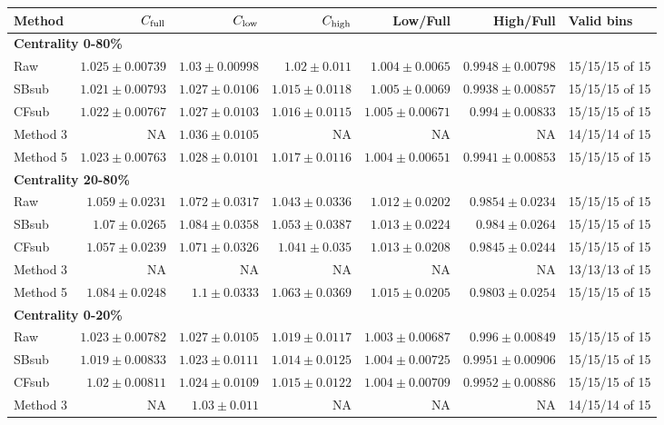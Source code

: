\documentclass[10pt,a4paper]{article}
\begin{document}
{\scriptsize\setlength{\tabcolsep}{3pt}\begin{longtable}{lrrrrrl}
\hline Method & $C_{\rm full}$ & $C_{\rm low}$ & $C_{\rm high}$ & Low/Full & High/Full & Valid bins\\\hline\endhead
\multicolumn{7}{l}{\textbf{Centrality 0-80\%}}\\
Raw & $1.025\pm0.00739$ & $1.03\pm0.00998$ & $1.02\pm0.011$ & $1.004\pm0.0065$ & $0.9948\pm0.00798$ & 15/15/15 of 15\\
SBsub & $1.021\pm0.00793$ & $1.027\pm0.0106$ & $1.015\pm0.0118$ & $1.005\pm0.0069$ & $0.9938\pm0.00857$ & 15/15/15 of 15\\
CFsub & $1.022\pm0.00767$ & $1.027\pm0.0103$ & $1.016\pm0.0115$ & $1.005\pm0.00671$ & $0.994\pm0.00833$ & 15/15/15 of 15\\
Method 3 & NA & $1.036\pm0.0105$ & NA & NA & NA & 14/15/14 of 15\\
Method 5 & $1.023\pm0.00763$ & $1.028\pm0.0101$ & $1.017\pm0.0116$ & $1.004\pm0.00651$ & $0.9941\pm0.00853$ & 15/15/15 of 15\\
\hline
\multicolumn{7}{l}{\textbf{Centrality 20-80\%}}\\
Raw & $1.059\pm0.0231$ & $1.072\pm0.0317$ & $1.043\pm0.0336$ & $1.012\pm0.0202$ & $0.9854\pm0.0234$ & 15/15/15 of 15\\
SBsub & $1.07\pm0.0265$ & $1.084\pm0.0358$ & $1.053\pm0.0387$ & $1.013\pm0.0224$ & $0.984\pm0.0264$ & 15/15/15 of 15\\
CFsub & $1.057\pm0.0239$ & $1.071\pm0.0326$ & $1.041\pm0.035$ & $1.013\pm0.0208$ & $0.9845\pm0.0244$ & 15/15/15 of 15\\
Method 3 & NA & NA & NA & NA & NA & 13/13/13 of 15\\
Method 5 & $1.084\pm0.0248$ & $1.1\pm0.0333$ & $1.063\pm0.0369$ & $1.015\pm0.0205$ & $0.9803\pm0.0254$ & 15/15/15 of 15\\
\hline
\multicolumn{7}{l}{\textbf{Centrality 0-20\%}}\\
Raw & $1.023\pm0.00782$ & $1.027\pm0.0105$ & $1.019\pm0.0117$ & $1.003\pm0.00687$ & $0.996\pm0.00849$ & 15/15/15 of 15\\
SBsub & $1.019\pm0.00833$ & $1.023\pm0.0111$ & $1.014\pm0.0125$ & $1.004\pm0.00725$ & $0.9951\pm0.00906$ & 15/15/15 of 15\\
CFsub & $1.02\pm0.00811$ & $1.024\pm0.0109$ & $1.015\pm0.0122$ & $1.004\pm0.00709$ & $0.9952\pm0.00886$ & 15/15/15 of 15\\
Method 3 & NA & $1.03\pm0.011$ & NA & NA & NA & 14/15/14 of 15\\

\end{longtable}}
\end{document}
